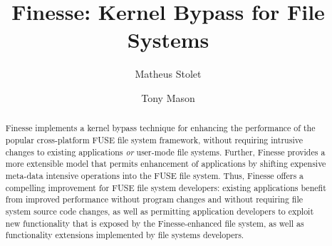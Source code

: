 \documentclass[sigplan,10pt,letter,plain]{acmart}
\begin{document}
\title{Finesse: Kernel Bypass for File Systems}


\author{Matheus Stolet}
\author{Tony Mason}

\renewcommand{\shortauthors}{M. Stolet et al.}

\begin{abstract}
  Finesse implements a kernel bypass technique for enhancing the performance of the popular cross-platform FUSE file system framework, without requiring intrusive changes to existing applications \textit{or} user-mode file systems.  Further, Finesse provides a more extensible model that permits enhancement of applications by shifting expensive meta-data intensive operations into the FUSE file system.  Thus, Finesse offers a compelling improvement for FUSE file system developers: existing applications benefit from improved performance without program changes and without requiring file system source code changes, as well as permitting application developers to exploit new functionality that is exposed by the Finesse-enhanced file system, as well as functionality extensions implemented by file systems developers.
\end{abstract}


\maketitle
\end{document}
